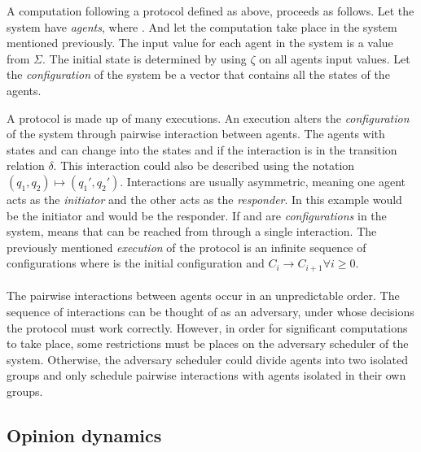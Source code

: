 A computation following a protocol defined as above, proceeds as follows. Let the system have  \emph{agents}, where . And let the computation take place in the system mentioned previously. The input value for each agent in the system is a value from $\Sigma$. The initial state is determined by using $\zeta$ on all agents input values. Let the \emph{configuration} of the system be a vector  that contains all the states of the agents. 

A protocol is made up of many executions. An execution alters the \emph{configuration} of the system through pairwise interaction between agents. The agents with states  and  can change into the states  and  if the interaction  is in the transition relation $\delta$. This interaction could also be described using the notation $(q_1, q_2) \mapsto (q_1', q_2')$. Interactions are usually asymmetric, meaning one agent acts as the \emph{initiator} and the other acts as the \emph{responder}. In this example  would be the initiator and  would be the responder. If  and  are \emph{configurations} in the system,  means that  can be reached from  through a single interaction. The previously mentioned \emph{execution} of the protocol is an infinite sequence of configurations  where  is the initial configuration and $C_i \rightarrow C_{i+1} \forall i \geq 0$. 
\\\\
The pairwise interactions between agents occur in an unpredictable order. The sequence of interactions can be thought of as an adversary, under whose decisions the protocol must work correctly. However, in order for significant computations to take place, some restrictions must be places on the adversary scheduler of the system. Otherwise, the adversary scheduler could divide agents into two isolated groups and only schedule pairwise interactions with agents isolated in their own groups.  



\subsection{Opinion dynamics}